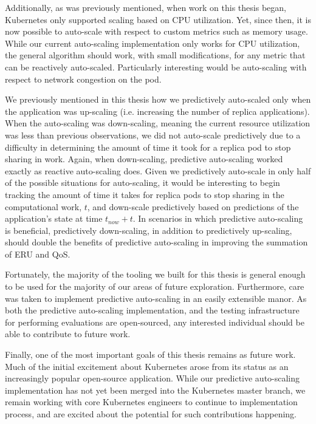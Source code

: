 Additionally, as was previously mentioned, when work on this thesis began,
Kubernetes only supported scaling based on CPU utilization. Yet, since then, it
is now possible to auto-scale with respect to custom metrics such as memory
usage. While our current auto-scaling implementation only works for CPU
utilization, the general algorithm should work, with small modifications, for
any metric that can be reactively auto-scaled. Particularly interesting would
be auto-scaling with respect to network congestion on the pod.

We previously mentioned in this thesis how we predictively auto-scaled
only when the application was up-scaling (i.e. increasing the number of replica
applications). When the auto-scaling was down-scaling, meaning the current
resource utilization was less than previous observations, we did not auto-scale
predictively due to a difficulty in determining the amount of time it took for a
replica pod to stop sharing in work. Again, when down-scaling, predictive
auto-scaling worked exactly as reactive auto-scaling does. Given we predictively
auto-scale in only half of the possible situations for auto-scaling, it would be
interesting to begin tracking the amount of time it takes for replica pods to
stop sharing in the computational work, $t$, and down-scale predictively based on
predictions of the application's state at time $t_{now} + t$. In scenarios in
which predictive auto-scaling is beneficial, predictively down-scaling, in
addition to predictively up-scaling, should double the benefits of predictive
auto-scaling in improving the summation of ERU and QoS.

Fortunately, the majority of the tooling we built for this thesis is general
enough to be used for the majority of our areas of future exploration.
Furthermore, care was taken to implement predictive auto-scaling in an easily
extensible manor. As both the predictive auto-scaling implementation, and the
testing infrastructure for performing evaluations are open-sourced, any
interested individual should be able to contribute to future work.

Finally, one of the most important goals of this thesis remains as future work.
Much of the initial excitement about Kubernetes arose from its status as an
increasingly popular open-source application. While our predictive auto-scaling
implementation has not yet been merged into the Kubernetes master branch, we
remain working with core Kubernetes engineers to continue to implementation
process, and are excited about the potential for such contributions happening.
